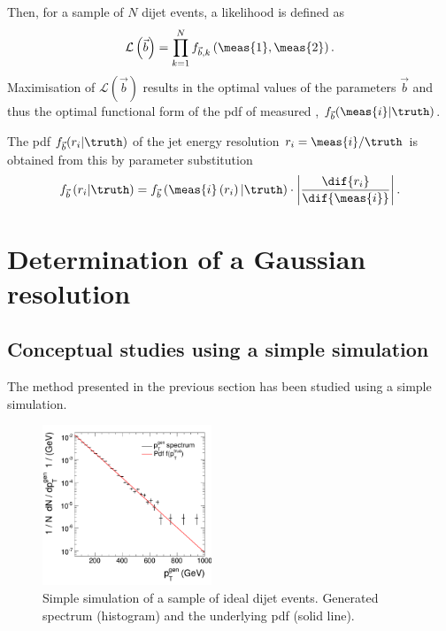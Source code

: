 \documentclass[a4paper]{cmspaper} %
\begin{document}
Then, for a sample of $N$ dijet events, a likelihood is defined as
\begin{equation}
  \label{eq:resFit:likelihood}
  \mathcal{L}\left(\vec{b}\right) = \prod^{N}_{k=1} f_{\vec{b},k}\left(\meas{1},\meas{2}\right).
\end{equation}
Maximisation of $\mathcal{L}(\vec{b})$ results in the optimal values of the parameters $\vec{b}$ and thus the optimal functional form of the pdf of measured \pt, $f_{\vec{b}}(\meas{i}|\truth)$.

The pdf $f_{\vec{b}}(r_{i}|\truth)$ of the jet energy resolution \mbox{$r_{i} = \meas{i} / \truth$} is obtained from this by parameter substitution
\begin{equation*}
  f_{\vec{b}}\left(r_{i}|\truth\right) =
  f_{\vec{b}}\left(\meas{i}\left(r_{i}\right)|\truth\right)\cdot\left|\frac{\dif{r_{i}}}{\dif{\meas{i}}}\right|.
\end{equation*}


\section{Determination of a Gaussian resolution}
\subsection{Conceptual studies using a simple simulation}
The method presented in the previous section has been studied using a
simple simulation.

\begin{figure}[ht]
  \begin{center}
     \includegraphics[width=0.45\textwidth]{figures/resFit_ToyMC_PtGenCuts_SpectrumLog}
   \end{center}
   \caption{Simple simulation of a sample of ideal dijet events.
     Generated \truth spectrum (histogram) and the underlying pdf (solid line).}
   \label{fig:resFit:toyMC:ptGenCuts:spectrum}
\end{figure}
\end{document}
